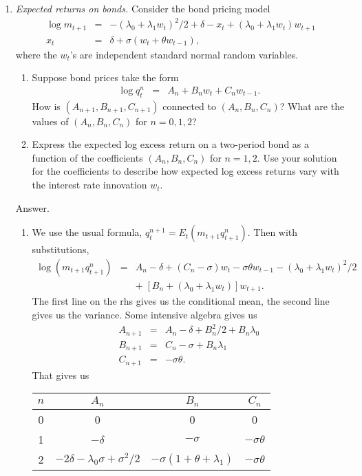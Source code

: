\documentclass[11pt]{article}
\begin{document}
\begin{enumerate}
\item  {\it Expected returns on bonds.\/}
Consider the bond pricing model
\begin{eqnarray*}
    \log m_{t+1} &=& - (\lambda_0 + \lambda_1 w_t)^2/2 + \delta - x_t
            + (\lambda_0 + \lambda_1 w_t) w_{t+1} \\
            x_{t} &=& \delta + \sigma (w_t + \theta w_{t-1}) ,
\end{eqnarray*}
where the $w_t$'s are independent standard normal random variables.
%
\begin{enumerate}
\item Suppose bond prices take the form
\begin{eqnarray*}
    \log q^n_t &=& A_n + B_n w_t + C_n w_{t-1} .
\end{eqnarray*}
How is $(A_{n+1},B_{n+1},C_{n+1})$ connected to $(A_{n},B_{n},C_{n})$?
What are the values of $(A_{n},B_{n},C_{n})$ for $n=0,1,2$?
\item Express the expected log excess return on a two-period bond as a function
of the coefficients $(A_{n},B_{n},C_{n})$ for $n=1,2$.
Use your solution for the coefficients to describe how expected log excess returns vary with the
interest rate innovation $w_t$.
\end{enumerate}
%
Answer.
\begin{enumerate}
\item We use the usual formula,
$ q^{n+1}_t = E_t (m_{t+1} q^n_{t+1})$.
Then with substitutions,
\begin{eqnarray*}
    \log (m_{t+1} q^n_{t+1}) &=& A_n - \delta + (C_n-\sigma) w_t - \sigma\theta w_{t-1}
            - (\lambda_0 + \lambda_1 w_t)^2/2 \\
            && + \; [B_n + (\lambda_0 + \lambda_1 w_t)] w_{t+1} .
\end{eqnarray*}
The first line on the rhs gives us the conditional mean, the second line gives us the variance.
Some intensive algebra gives us
\begin{eqnarray*}
    A_{n+1} &=& A_n - \delta + B_n^2/2 + B_n \lambda_0 \\
    B_{n+1} &=& C_n - \sigma + B_n \lambda_1 \\
    C_{n+1} &=& - \sigma \theta .
\end{eqnarray*}
That gives us
\begin{center}
\begin{tabular}{cccc}
$n$ & $A_n$ & $B_n$ & $C_n$ \\
\midrule
0 & 0 & 0 & 0 \\
1 & $-\delta$ & $-\sigma$ & $-\sigma \theta$ \\
2 & $- 2\delta -\lambda_0 \sigma + \sigma^2/2$ & $- \sigma (1+\theta+\lambda_1)$ & $-\sigma\theta$
\end{tabular}
\end{center}


\end{enumerate}
\end{enumerate}
\end{document}
